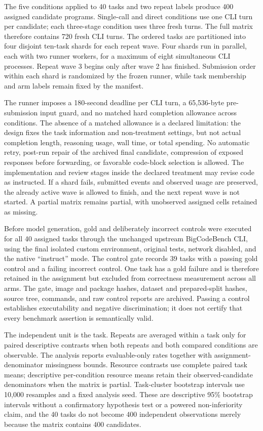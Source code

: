 The five conditions applied to 40 tasks and two repeat labels produce 400 assigned candidate programs. Single-call and direct conditions use one CLI turn per candidate; each three-stage condition uses three fresh turns. The full matrix therefore contains 720 fresh CLI turns. The ordered tasks are partitioned into four disjoint ten-task shards for each repeat wave. Four shards run in parallel, each with two runner workers, for a maximum of eight simultaneous CLI processes. Repeat wave 3 begins only after wave 2 has finished. Submission order within each shard is randomized by the frozen runner, while task membership and arm labels remain fixed by the manifest.

The runner imposes a 180-second deadline per CLI turn, a 65,536-byte pre-submission input guard, and no matched hard completion allowance across conditions. The absence of a matched allowance is a declared limitation: the design fixes the task information and non-treatment settings, but not actual completion length, reasoning usage, wall time, or total spending. No automatic retry, post-run repair of the archived final candidate, compression of exposed responses before forwarding, or favorable code-block selection is allowed. The implementation and review stages inside the declared treatment may revise code as instructed. If a shard fails, submitted events and observed usage are preserved, the already active wave is allowed to finish, and the next repeat wave is not started. A partial matrix remains partial, with unobserved assigned cells retained as missing.

Before model generation, gold and deliberately incorrect controls were executed for all 40 assigned tasks through the unchanged upstream BigCodeBench CLI, using the final isolated custom environment, original tests, network disabled, and the native ``instruct'' mode. The control gate records 39 tasks with a passing gold control and a failing incorrect control. One task has a gold failure and is therefore retained in the assignment but excluded from correctness measurement across all arms. The gate, image and package hashes, dataset and prepared-split hashes, source tree, commands, and raw control reports are archived. Passing a control establishes executability and negative discrimination; it does not certify that every benchmark assertion is semantically valid.

The independent unit is the task. Repeats are averaged within a task only for paired descriptive contrasts when both repeats and both compared conditions are observable. The analysis reports evaluable-only rates together with assignment-denominator missingness bounds. Resource contrasts use complete paired task means; descriptive per-condition resource means retain their observed-candidate denominators when the matrix is partial. Task-cluster bootstrap intervals use 10,000 resamples and a fixed analysis seed. These are descriptive 95\% bootstrap intervals without a confirmatory hypothesis test or a powered non-inferiority claim, and the 40 tasks do not become 400 independent observations merely because the matrix contains 400 candidates.

